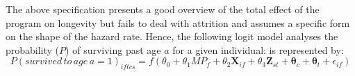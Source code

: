 The above specification presents a good overview of the total effect of the program on longevity but fails to deal with attrition and assumes a specific form on the shape of the hazard rate. Hence, the following logit model analyses the probability ($P$) of surviving past age $a$ for a given individual: is represented by:
$$
P(survived\,to\,age\,a=1)_{iftcs} = f(\theta_0 + \theta_1MP_f + \theta_2\mathbf{X}_{if} + \theta_3\mathbf{Z}_{st} + \mathbf{\theta}_c + \mathbf{\theta}_t + \epsilon_{if})
$$